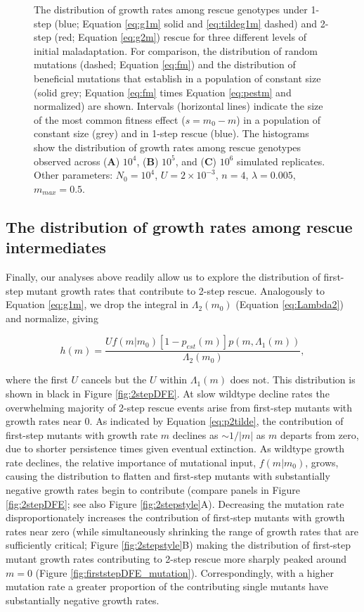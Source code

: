 \documentclass[9pt,twocolumn,twoside,lineno]{gsajnl}
\begin{document}
\begin{figure}[htbp]
\caption{
The distribution of growth rates among rescue genotypes under 1-step (blue; Equation \ref{eq:g1m} solid and \ref{eq:tildeg1m} dashed) and 2-step (red; Equation \ref{eq:g2m}) rescue for three different levels of initial maladaptation.
For comparison, the distribution of random mutations (dashed; Equation \ref{eq:fm}) and the distribution of beneficial mutations that establish in a population of constant size (solid grey; Equation \ref{eq:fm} times Equation \ref{eq:pestm} and normalized) are shown.
Intervals (horizontal lines) indicate the size of the most common fitness effect ($s=m_0-m$) in a population of constant size (grey) and in 1-step rescue (blue).
The histograms show the distribution of growth rates among rescue genotypes observed across (\textbf{A}) $10^4$, (\textbf{B}) $10^5$, and (\textbf{C}) $10^6$ simulated replicates.
Other parameters: $N_0=10^4$, $U=2\times 10^{-3}$, $n=4$, $\lambda=0.005$, $m_{max}=0.5$.
}%
\label{fig:1and2stepDFE}
\end{figure}

\subsection{The distribution of growth rates among rescue intermediates}
\label{sec:m1DFE}

Finally, our analyses above readily allow us to explore the distribution of first-step mutant growth rates that contribute to 2-step rescue.
Analogously to Equation \ref{eq:g1m}, we drop the integral in $\Lambda_2(m_0)$ (Equation \ref{eq:Lambda2}) and normalize, giving

\begin{equation}\label{eq:hm}
h(m) = \frac{U f(m|m_0) \left[ 1 - p_{est}(m) \right] p(m,\Lambda_{1}(m))}{\Lambda_2(m_0)},
\end{equation}

\noindent where the first $U$ cancels but the $U$ within $\Lambda_{1}(m)$ does not.
This distribution is shown in black in Figure \ref{fig:2stepDFE}.
At slow wildtype decline rates the overwhelming majority of 2-step rescue events arise from first-step mutants with growth rates near 0.
As indicated by Equation \ref{eq:p2tilde}, the contribution of first-step mutants with growth rate $m$ declines as $\sim1/|m|$ as $m$ departs from zero, due to shorter persistence times given eventual extinction.
As wildtype growth rate declines, the relative importance of mutational input, $f(m|m_0)$, grows, causing the distribution to flatten and first-step mutants with substantially negative growth rates begin to contribute (compare panels in Figure \ref{fig:2stepDFE}; see also Figure \ref{fig:2stepstyle}A).
Decreasing the mutation rate disproportionately increases the contribution of first-step mutants with growth rates near zero (while simultaneously shrinking the range of growth rates that are sufficiently critical; Figure \ref{fig:2stepstyle}B) making the distribution of first-step mutant growth rates contributing to 2-step rescue more sharply peaked around $m=0$ (Figure \ref{fig:firststepDFE_mutation}).
Correspondingly, with a higher mutation rate a greater proportion of the contributing single mutants have substantially negative growth rates.
\end{document}
